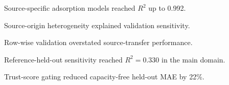 \begin{highlights}
\item Source-specific adsorption models reached $R^2$ up to 0.992.
\item Source-origin heterogeneity explained validation sensitivity.
\item Row-wise validation overstated source-transfer performance.
\item Reference-held-out sensitivity reached $R^2 = 0.330$ in the main domain.
\item Trust-score gating reduced capacity-free held-out MAE by 22\%.
\end{highlights}
